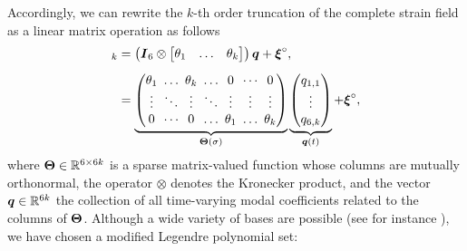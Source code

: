 \noindent Accordingly, we can rewrite the $k$-th order truncation of the complete strain field as a linear matrix operation as follows
%
\begin{align}
[\vec{\xi}]_k  & = \left(\vec{I}_6  \otimes \begin{bmatrix} \theta_1 & \hdots & \theta_k \end{bmatrix} \right) \vec{q} + \vec{\xi}^\circ,  \notag \\[0.5em]
& =
\begingroup %
\setlength\arraycolsep{2.5pt}
\underbrace{\begin{pmatrix}
\theta_1 & \hdots & \theta_k & \hdots & 0 & \cdots&  0 \\
\vdots & \ddots & \vdots & \ddots & \vdots & \vdots & \vdots \\
0 & \cdots&  0 & \hdots & \theta_1 & \hdots & \theta_k\end{pmatrix}}_{{\mat{\Theta}(\sigma)}}
\endgroup
\underbrace{\begin{pmatrix} q_{1,1} \\ \vdots \\ q_{6,k}\end{pmatrix}}_{\vec{q}(t)} + \vec{\xi}^\circ,
\label{eq:trunc_2}
\end{align}
%
where $\boldsymbol{\Theta} \in \mathbb{R}^{6 \times 6k}$ is a sparse matrix-valued function whose columns are mutually orthonormal, the operator $\otimes$ denotes the Kronecker product, and the vector $\boldsymbol{q} \in \mathbb{R}^{6k}$ the collection of all time-varying modal coefficients related to the columns of $\boldsymbol{\Theta}$. Although a wide variety of bases are possible (see for instance \cite{Boyer2021,DellaSantina2020}), we have chosen a modified Legendre polynomial set:
%
